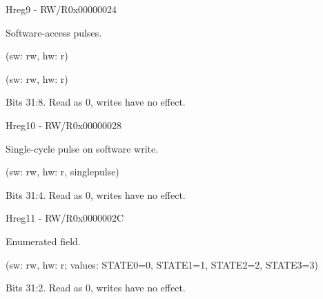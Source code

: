 \documentclass{article}
\begin{document}
\begin{register}{H}{reg9 - RW/R}{0x00000024}  \par Software-access pulses. \regnewline
  \label{reg9}
\regnewline
  \begin{regdesc}\begin{reglist}[field0]
    \item [field0] (sw: rw, hw: r)
    \item [field1] (sw: rw, hw: r)
    \item [reserved] Bits 31:8. Read as 0, writes have no effect.
  \end{reglist}\end{regdesc}
\end{register}

\begin{register}{H}{reg10 - RW/R}{0x00000028}  \par Single-cycle pulse on software write. \regnewline
  \label{reg10}
\regnewline
  \begin{regdesc}\begin{reglist}[field0]
    \item [field0] (sw: rw, hw: r, singlepulse)
    \item [reserved] Bits 31:4. Read as 0, writes have no effect.
  \end{reglist}\end{regdesc}
\end{register}

\begin{register}{H}{reg11 - RW/R}{0x0000002C}  \par Enumerated field. \regnewline
  \label{reg11}
\regnewline
  \begin{regdesc}\begin{reglist}[field0]
    \item [field0] (sw: rw, hw: r; values: STATE0=0, STATE1=1, STATE2=2, STATE3=3)
    \item [reserved] Bits 31:2. Read as 0, writes have no effect.
  \end{reglist}\end{regdesc}
\end{register}
\end{document}
